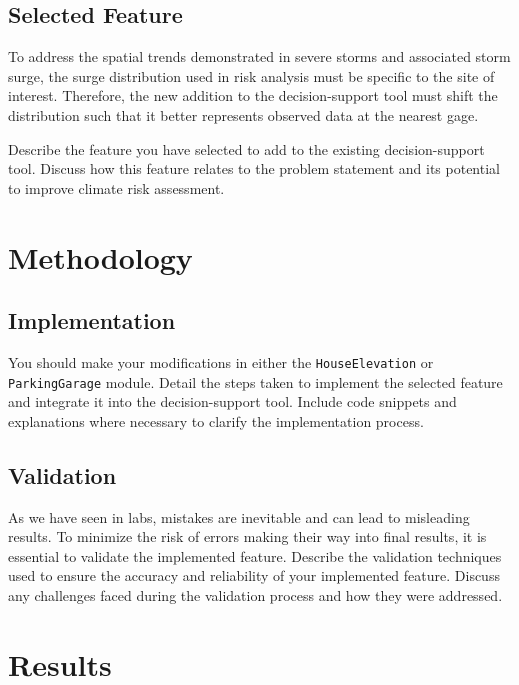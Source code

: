 \documentclass[
  11pt,
]{article}
\begin{document}
\hypertarget{selected-feature}{%
\subsection{Selected Feature}\label{selected-feature}}

To address the spatial trends demonstrated in severe storms and
associated storm surge, the surge distribution used in risk analysis
must be specific to the site of interest. Therefore, the new addition to
the decision-support tool must shift the distribution such that it
better represents observed data at the nearest gage.

Describe the feature you have selected to add to the existing
decision-support tool. Discuss how this feature relates to the problem
statement and its potential to improve climate risk assessment.

\hypertarget{methodology}{%
\section{Methodology}\label{methodology}}

\hypertarget{implementation}{%
\subsection{Implementation}\label{implementation}}

You should make your modifications in either the \texttt{HouseElevation}
or \texttt{ParkingGarage} module. Detail the steps taken to implement
the selected feature and integrate it into the decision-support tool.
Include code snippets and explanations where necessary to clarify the
implementation process.

\hypertarget{validation}{%
\subsection{Validation}\label{validation}}

As we have seen in labs, mistakes are inevitable and can lead to
misleading results. To minimize the risk of errors making their way into
final results, it is essential to validate the implemented feature.
Describe the validation techniques used to ensure the accuracy and
reliability of your implemented feature. Discuss any challenges faced
during the validation process and how they were addressed.

\hypertarget{results}{%
\section{Results}\label{results}}
\end{document}
